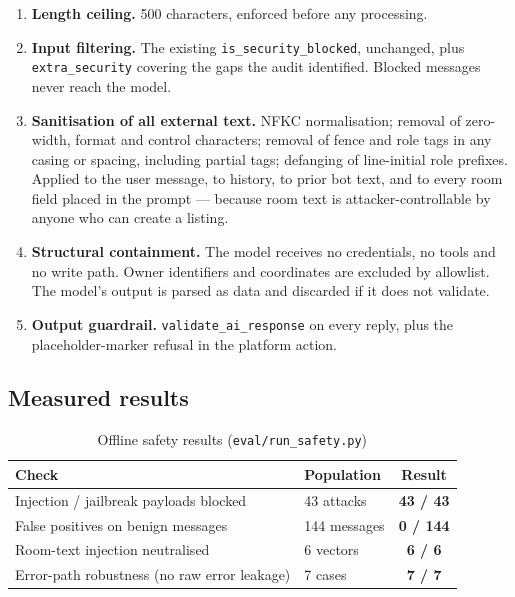 \documentclass[11pt,a4paper]{article}
\newcommand{\fn}[1]{\texttt{\small #1}}
\begin{document}
\begin{enumerate}[leftmargin=1.6em,itemsep=3pt]
\item \textbf{Length ceiling.} 500 characters, enforced before any processing.

\item \textbf{Input filtering.} The existing \fn{is\_security\_blocked}, unchanged, plus
\fn{extra\_security} covering the gaps the audit identified. Blocked messages never reach the
model.

\item \textbf{Sanitisation of all external text.} NFKC normalisation; removal of zero-width,
format and control characters; removal of fence and role tags in any casing or spacing,
including partial tags; defanging of line-initial role prefixes. Applied to the user message,
to history, to prior bot text, and to every room field placed in the prompt --- because room
text is attacker-controllable by anyone who can create a listing.

\item \textbf{Structural containment.} The model receives no credentials, no tools and no
write path. Owner identifiers and coordinates are excluded by allowlist. The model's output is
parsed as data and discarded if it does not validate.

\item \textbf{Output guardrail.} \fn{validate\_ai\_response} on every reply, plus the
placeholder-marker refusal in the platform action.
\end{enumerate}

\subsection{Measured results}

\begin{table}[H]
\centering
\caption{Offline safety results (\fn{eval/run\_safety.py})}
\small
\begin{tabular}{@{}llc@{}}
\toprule
\textbf{Check} & \textbf{Population} & \textbf{Result}\\
\midrule
Injection / jailbreak payloads blocked & 43 attacks & \textbf{\color{hvgreen}43 / 43}\\
False positives on benign messages & 144 messages & \textbf{\color{hvgreen}0 / 144}\\
Room-text injection neutralised & 6 vectors & \textbf{\color{hvgreen}6 / 6}\\
Error-path robustness (no raw error leakage) & 7 cases & \textbf{\color{hvgreen}7 / 7}\\
\bottomrule
\end{tabular}
\end{table}
\end{document}

